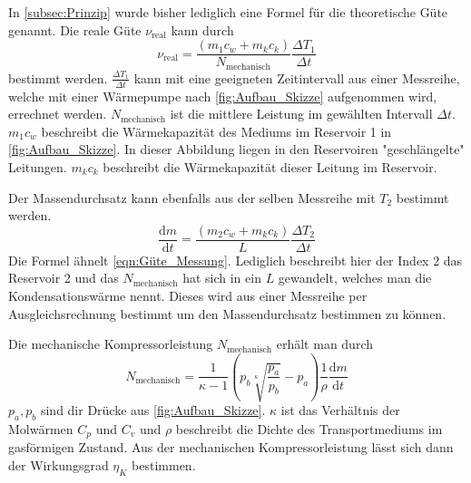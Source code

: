 In \autoref{subsec:Prinzip} wurde bisher lediglich eine Formel für die theoretische Güte genannt. Die reale Güte $\nu_{\text{real}}$ kann durch 
\begin{equation}
    \label{eqn:Güte_Messung}
    \nu_{\text{real}} = \frac{\left(m_1 c_w + m_k c_k\right)}{N_{\text{mechanisch}}}\frac{\Delta T_1}{\Delta t}
\end{equation}
bestimmt werden. $\frac{\Delta T_1}{\Delta t}$ kann mit eine geeigneten Zeitintervall aus einer Messreihe, welche mit einer Wärmepumpe nach \autoref{fig:Aufbau_Skizze} aufgenommen wird,
errechnet werden. $N_{\text{mechanisch}}$ ist die mittlere Leistung im gewählten Intervall $\Delta t$. $m_1c_w$ beschreibt die Wärmekapazität des Mediums im Reservoir 1 in \autoref{fig:Aufbau_Skizze}. In dieser Abbildung 
liegen in den Reservoiren "geschlängelte" Leitungen. $m_kc_k$ beschreibt die Wärmekapazität dieser Leitung im Reservoir. 


Der Massendurchsatz kann ebenfalls aus der selben Messreihe mit $T_2$ bestimmt werden. 
\begin{equation}
    \label{eqn:Massendurchsatz}
    \frac{\text{d}m}{\text{d}t} = \frac{\left(m_2 c_w + m_k c_k\right)}{L}\frac{\Delta T_2}{\Delta t}
\end{equation}
Die Formel ähnelt \autoref{eqn:Güte_Messung}. Lediglich beschreibt hier der Index 2 das Reservoir 2 und das $N_{\text{mechanisch}}$ hat sich in ein $L$ gewandelt, welches man die Kondensationswärme nennt.
Dieses wird aus einer Messreihe per Ausgleichsrechnung bestimmt um den Massendurchsatz bestimmen zu können.


Die mechanische Kompressorleistung $N_{\text{mechanisch}}$ erhält man durch
\begin{equation}
    \label{eqn:Leistung}
    N_{\text{mechanisch}} = \frac{1}{\kappa - 1}\left(p_b \sqrt[\kappa]{\frac{p_a}{p_b}} - p_a \right) \frac{1}{\rho} \frac{\text{d}m}{\text{d}t}
\end{equation}
$p_a, p_b$ sind dir Drücke aus \autoref{fig:Aufbau_Skizze}. $\kappa$ ist das Verhältnis der Molwärmen $C_p$ und $C_v$ und $\rho$ beschreibt die Dichte des Transportmediums im gasförmigen
Zustand. Aus der mechanischen Kompressorleistung lässt sich dann der Wirkungsgrad $\eta_K$ bestimmen.